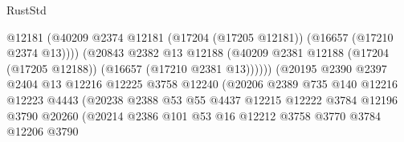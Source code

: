 \begin{lexlean}{RustStd}
\begin{coremodule}
                                          @12181
                                          (@40209
                                            @2374
                                            @12181
                                            (@17204 (@17205 @12181))
                                            (@16657 (@17210 @2374 @13))))
                                        (@20843
                                          @2382
                                          @13
                                          @12188
                                          (@40209
                                            @2381
                                            @12188
                                            (@17204 (@17205 @12188))
                                            (@16657 (@17210 @2381 @13))))))
                                    (@20195
                                      @2390
                                      @2397
                                      @2404
                                      @13
                                      @12216
                                      @12225
                                      @3758
                                      @12240
                                      (@20206
                                        @2389
                                        @735
                                        @140
                                        @12216
                                        @12223
                                        @4443
                                        (@20238
                                          @2388
                                          @53
                                          @55
                                          @4437
                                          @12215
                                          @12222
                                          @3784
                                          @12196
                                          @3790
                                          @20260
                                          (@20214
                                            @2386
                                            @101
                                            @53
                                            @16
                                            @12212
                                            @3758
                                            @3770
                                            @3784
                                            @12206
                                            @3790

\end{coremodule}
\end{lexlean}
